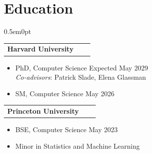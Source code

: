 \documentclass[letterpaper,11pt]{article}
\makeatletter
\newenvironment{joblong}[2]
    {
    \begin{tabularx}{\linewidth}{@{}l X r@{}}
    \textbf{#1} & \hfill &  #2 \\[3pt]
    \end{tabularx}
    \begin{minipage}[t]{\linewidth}
    \begin{itemize}[nosep,after=\strut, leftmargin=2em, itemsep=3pt,label=--]
    }
    {
    \end{itemize}
    \end{minipage}
    }
\makeatother
\begin{document}
\section{Education}
\begin{adjustwidth}{0.5em}{0pt}

\begin{joblong}{Harvard University}{}
\item PhD, Computer Science \hfill Expected May 2029 \\
\textit{Co-advisors}: Patrick Slade, Elena Glassman
\item SM, Computer Science \hfill May 2026 \\
\end{joblong}

\vspace{-20pt}
\begin{joblong}{Princeton University}{}
\item BSE, Computer Science \hfill May 2023
\item Minor in Statistics and Machine Learning
\end{joblong}




\end{adjustwidth}
\end{document}
